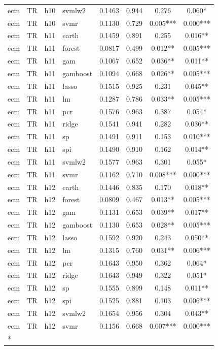 \begin{ThreePartTable}
\begin{longtable}[t]{llclcccc}
ecm & TR & h10 & svmlw2 & 0.1463 & 0.944 & 0.276 & 0.060*\\
ecm & TR & h10 & svmr & 0.1130 & 0.729 & 0.005*** & 0.000***\\
\addlinespace
ecm & TR & h11 & earth & 0.1459 & 0.891 & 0.255 & 0.016**\\
ecm & TR & h11 & forest & 0.0817 & 0.499 & 0.012** & 0.005***\\
ecm & TR & h11 & gam & 0.1067 & 0.652 & 0.036** & 0.011**\\
ecm & TR & h11 & gamboost & 0.1094 & 0.668 & 0.026** & 0.005***\\
ecm & TR & h11 & lasso & 0.1515 & 0.925 & 0.231 & 0.045**\\
ecm & TR & h11 & lm & 0.1287 & 0.786 & 0.033** & 0.005***\\
ecm & TR & h11 & pcr & 0.1576 & 0.963 & 0.387 & 0.054*\\
ecm & TR & h11 & ridge & 0.1541 & 0.941 & 0.282 & 0.036**\\
ecm & TR & h11 & sp & 0.1491 & 0.911 & 0.153 & 0.010***\\
ecm & TR & h11 & spi & 0.1490 & 0.910 & 0.162 & 0.014**\\
ecm & TR & h11 & svmlw2 & 0.1577 & 0.963 & 0.301 & 0.055*\\
ecm & TR & h11 & svmr & 0.1162 & 0.710 & 0.008*** & 0.000***\\
\addlinespace
ecm & TR & h12 & earth & 0.1446 & 0.835 & 0.170 & 0.018**\\
ecm & TR & h12 & forest & 0.0809 & 0.467 & 0.013** & 0.005***\\
ecm & TR & h12 & gam & 0.1131 & 0.653 & 0.039** & 0.017**\\
ecm & TR & h12 & gamboost & 0.1130 & 0.653 & 0.028** & 0.005***\\
ecm & TR & h12 & lasso & 0.1592 & 0.920 & 0.243 & 0.050**\\
ecm & TR & h12 & lm & 0.1315 & 0.760 & 0.031** & 0.006***\\
ecm & TR & h12 & pcr & 0.1643 & 0.950 & 0.362 & 0.064*\\
ecm & TR & h12 & ridge & 0.1643 & 0.949 & 0.322 & 0.051*\\
ecm & TR & h12 & sp & 0.1555 & 0.899 & 0.148 & 0.011**\\
ecm & TR & h12 & spi & 0.1525 & 0.881 & 0.103 & 0.006***\\
ecm & TR & h12 & svmlw2 & 0.1654 & 0.956 & 0.304 & 0.043**\\
ecm & TR & h12 & svmr & 0.1156 & 0.668 & 0.007*** & 0.000***\\*
\end{longtable}
\end{ThreePartTable}
\endgroup{}
